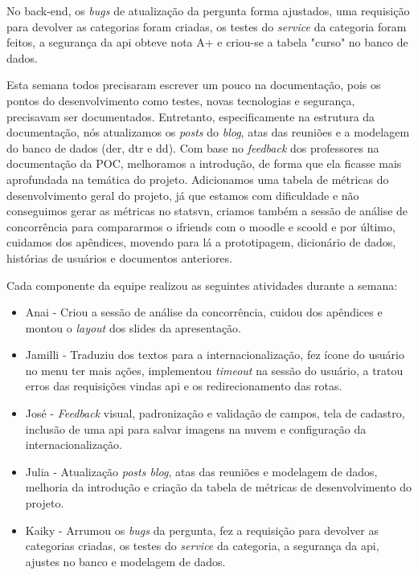 No \gls{back-end}, os \textit{bugs} de atualização da pergunta forma ajustados, uma requisição para devolver as categorias foram criadas, os testes do \textit{service} da categoria foram feitos, a segurança da \acs{api} obteve nota A+ e criou-se a tabela "curso" no banco de dados.

Esta semana todos precisaram escrever um pouco na documentação, pois os pontos do desenvolvimento como testes, novas tecnologias e segurança, precisavam ser documentados. Entretanto, especificamente na estrutura da documentação, nós atualizamos os \textit{posts} do \textit{blog}, atas das reuniões e a modelagem do banco de dados (\acs{der}, \acs{dtr} e \acs{dd}). Com base no \textit{feedback} dos professores na documentação da \acs{POC},  melhoramos a introdução, de forma que ela ficasse mais aprofundada na temática do projeto. Adicionamos uma tabela de métricas do desenvolvimento geral do projeto, já que estamos com dificuldade e não conseguimos gerar as métricas no \gls{statsvn}, criamos também a sessão de análise de concorrência para compararmos o \gls{ifriends} com o \gls{moodle} e \gls{scoold} e por último, cuidamos dos apêndices, movendo para lá a prototipagem, dicionário de dados, histórias de usuários e documentos anteriores.

Cada componente da equipe realizou as seguintes atividades durante a semana:

\begin{itemize}
    \item Anai - Criou a sessão de análise da concorrência, cuidou dos apêndices e montou o \textit{layout} dos slides da apresentação.  
    \item Jamilli - Traduziu dos textos para  a internacionalização, fez ícone do usuário no menu ter mais ações, implementou \textit{timeout} na sessão do usuário, a tratou erros das requisições vindas \acs{api} e os redirecionamento das rotas.
    \item José - \textit{Feedback} visual, padronização e validação de campos, tela de cadastro, inclusão de uma \acs{api} para salvar imagens na nuvem e configuração da internacionalização.  
    \item Julia - Atualização \textit{posts blog}, atas das reuniões e modelagem de dados, melhoria da introdução e criação da tabela de métricas de desenvolvimento do projeto.
    \item Kaiky - Arrumou os \textit{bugs} da pergunta, fez a requisição para devolver as categorias criadas, os testes do \textit{service} da categoria, a segurança da \acs{api}, ajustes no banco e modelagem de dados. 
\end{itemize}

